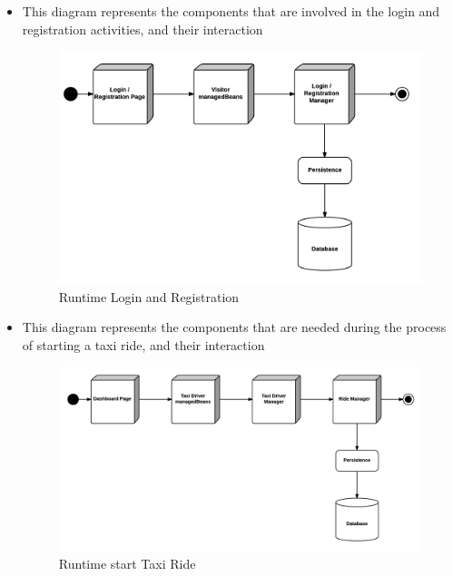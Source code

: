 \begin{itemize}
	\item This diagram represents the components that are involved in the login and registration activities, and their interaction
	\begin{figure}[htbp]
	\centering
	\includegraphics[width=\textwidth]{cpt/img/RuntimeLoginRegisterView}
	\caption{Runtime Login and Registration}
	\end{figure}
	\clearpage
	
	\item This diagram represents the components that are needed during the process of starting a taxi ride, and their interaction
	\begin{figure}[htbp]
	\centering
	\includegraphics[width=\textwidth]{cpt/img/RuntimeStartTaxiRideView}
	\caption{Runtime start Taxi Ride}
	\end{figure}
	\clearpage
	

\end{itemize}
